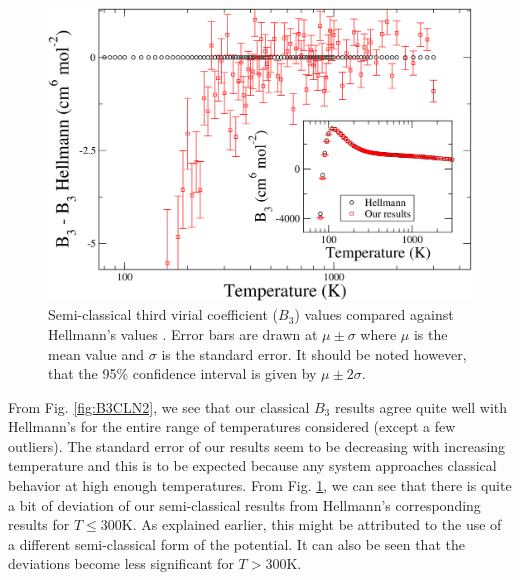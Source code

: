         \begin{figure}[!htbp]
            \centering
            \includegraphics[scale=0.20,keepaspectratio]{Chapter-5/Figures/B3SCFull8sResultsAll.png}
            \caption{Semi-classical third virial coefficient ($B_3$) values compared against Hellmann's values \cite{Hellmann2013}. Error bars are drawn at $\mu \pm \sigma$ where $\mu$ is the mean value and $\sigma$ is the standard error. It should be noted however, that the 95\% confidence interval is given by $\mu \pm 2\sigma$.}
            \label{fig:B3SCN2}
        \end{figure}

        From Fig. \ref{fig:B3CLN2}, we see that our classical $B_3$ results agree quite well with Hellmann's for the entire range of temperatures considered (except a few outliers). The standard error of our results seem to be decreasing with increasing temperature and this is to be expected because any system approaches classical behavior at high enough temperatures. From Fig. \ref{fig:B3SCN2}, we can see that there is quite a bit of deviation of our semi-classical results from Hellmann's corresponding results for $T \le 300$K. As explained earlier, this might be attributed to the use of a different semi-classical form of the \abinitio{} potential. It can also be seen that the deviations become less significant for $T > 300$K.


